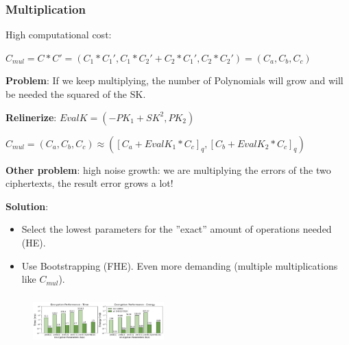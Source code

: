 \documentclass[10pt,handout]{beamer}
\begin{document}
\begin{frame}[noframenumbering]

    \frametitle{Multiplication}

    High computational cost:
    \vspace{-0.15cm}

    $C_{mul} = C*C' = (C_1*C_1',C_1*C_2'+C_2*C_1', C_2*C_2') = (C_a,C_b,C_c)$
    \vspace{-0.15cm}

    \textbf{Problem}: If we keep multiplying, the number of Polynomials will grow and will be needed
    the squared of the SK.

    \textbf{Relinerize}:
    $EvalK = (-PK_1+SK^2, PK_2)$

    $C_{mul} = (C_a, C_b, C_c)\approx ([C_a+EvalK_1*C_c]_q, [C_b+EvalK_2*C_c]_q)$

    \textbf{Other problem}: high noise growth: we are multiplying the errors of the two ciphertexts, the result error
    grows a lot!
    \vspace{-0.1cm}

    \textbf{Solution}: \vspace{-0.3cm}
    \begin{itemize} \vspace{-0.2cm}
        \item Select the lowest parameters for the ''exact'' amount  of operations needed (HE). \vspace{-0.2cm}
            \vspace{-0.25cm}
        \item Use Bootstrapping  (FHE). Even more demanding (multiple multiplications like $C_{mul}$).
    \end{itemize}
\end{frame}

\begin{frame}[noframenumbering]
\frametitle{}
\begin{figure}
    \includegraphics[width=0.45\textwidth]{SW_comp.png}
\end{figure}

\end{frame}
\end{document}
